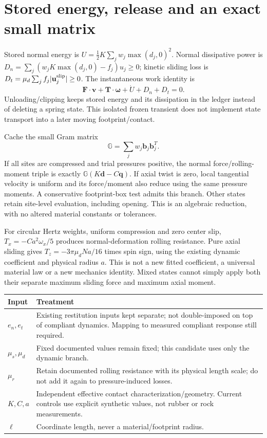 \documentclass[10pt,a4paper]{article}
\begin{document}
\newpage
\section*{Stored energy, release and an exact small matrix}
Stored normal energy is $U=\tfrac12K\sum_j w_j\max(d_j,0)^2$.
Normal dissipative power is $D_n=\sum_j(w_j K\max(d_j,0)-f_j)u_j\geq0$;
kinetic sliding loss is $D_t=\mu_d\sum_j f_j |\mathbf u_j^{\rm slip}|\geq0$.
The instantaneous work identity is
\[
 \mathbf F\cdot\mathbf v+\mathbf T\cdot\boldsymbol\omega+\dot U+D_n+D_t=0.
\]
Unloading/clipping keeps stored energy and its dissipation in the ledger instead
of deleting a spring state. This isolated frozen transient does not implement
state transport into a later moving footprint/contact.

Cache the small Gram matrix
\[
 \mathbb G=\sum_j w_j\mathbf b_j\mathbf b_j^T.
\]
If all sites are compressed and trial pressures positive, the normal
force/rolling-moment triple is exactly
$\mathbb G(K\mathbf d-C\mathbf q)$.
If axial twist is zero, local tangential velocity is uniform and its force/moment
also reduce using the same pressure moments. A conservative footprint-box test
admits this branch. Other states retain site-level evaluation, including opening.
This is an algebraic reduction, with no altered material constants or tolerances.

For circular Hertz weights, uniform compression and zero center slip,
$T_x=-Ca^2\omega_x/5$ produces normal-deformation rolling resistance.
Pure axial sliding gives $T_z=-3\pi\mu_dNa/16$ times spin sign, using the existing
dynamic coefficient and physical radius $a$. This is not a new fitted coefficient,
a universal material law or a new mechanics identity. Mixed states cannot simply
apply both their separate maximum sliding force and maximum axial moment.

\begin{center}\begin{tabular}{p{.2\linewidth}p{.69\linewidth}}\toprule
Input & Treatment \\\midrule
$e_n,e_t$ & Existing restitution inputs kept separate; not double-imposed on top of compliant dynamics. Mapping to measured compliant response still required.\\
$\mu_s,\mu_d$ & Fixed documented values remain fixed; this candidate uses only the dynamic branch.\\
$\mu_r$ & Retain documented rolling resistance with its physical length scale; do not add it again to pressure-induced losses.\\
$K,C,a$ & Independent effective contact characterization/geometry. Current controls use explicit synthetic values, not rubber or rock measurements.\\
$\ell$ & Coordinate length, never a material/footprint radius.\\\bottomrule
\end{tabular}\end{center}
\end{document}
